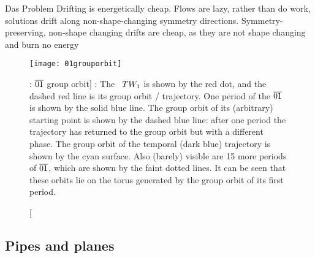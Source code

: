 




    \ifdraft\color{blue}
{\large Das Problem}
Drifting is energetically cheap.
Flows are lazy, rather than do work, solutions drift along non-shape-changing
symmetry directions.
Symmetry-preserving, non-shape changing  drifts are cheap, as they are not
shape changing and burn no energy


    \color{black}\fi


\begin{figure}
\begin{center}
  \texttt{[image: 01grouporbit]}
\end{center}
  \caption
  [\CLf: $\overline{01}$ {\rpo} group orbit]{
  \CLf: The \reqv\ $TW_{1}$ is shown by the red dot, and the dashed red
  line is its group orbit / trajectory. One period of the $\overline{01}$ {\rpo} is
  shown by the solid blue line. The group orbit of its (arbitrary) starting point
  is shown by the dashed blue line: after one
  period the trajectory has returned to the group orbit but with a different phase. The
  group orbit of the temporal (dark blue) trajectory is shown by the
  cyan surface. Also (barely) visible are 15 more periods of $\overline{01}$, which
  are shown by the faint dotted lines. It can be seen that these orbits lie on
  the torus generated by the group orbit of its first period.}
\label{fig:CLf01group}
\end{figure}


\subsection{Pipes and planes}


